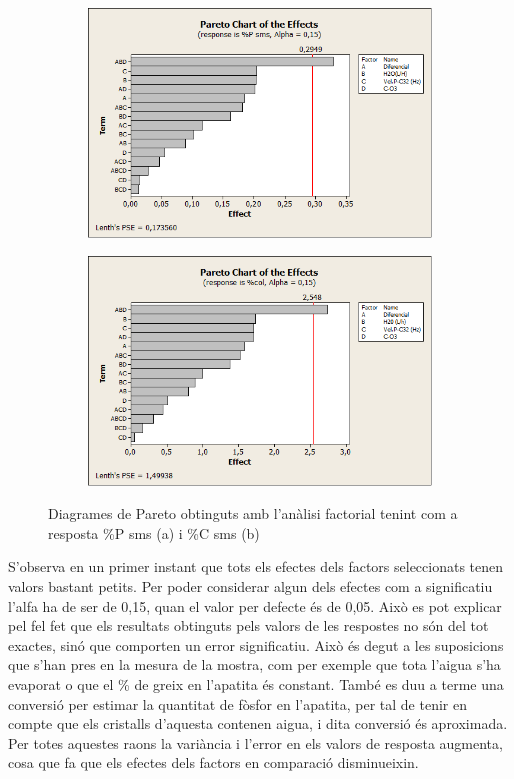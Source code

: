\documentclass[a4paper]{article}
\begin{document}
\begin{figure}[H]
	\begin{subfigure}{.5\textwidth}
		\centering
		\includegraphics[width=.9\linewidth]{images/Pareto15P}
		\caption{}
		\label{fig:Pareto15P}
	\end{subfigure}%
	\begin{subfigure}{.5\textwidth}
		\centering
		\includegraphics[width=.9\linewidth]{images/Pareto15col}
		\caption{}
		\label{fig:Pareto15C}
	\end{subfigure}
	\caption{Diagrames de Pareto obtinguts amb l’anàlisi factorial tenint com a resposta \%P sms (a) i \%C sms (b)}
	\label{fig:Pareto15}
\end{figure}

S’observa en un primer instant que tots els efectes dels factors seleccionats tenen valors bastant petits. Per poder considerar algun dels efectes com a significatiu l’alfa ha de ser de 0,15, quan el valor per defecte és de 0,05. Això es pot explicar pel fel fet que els resultats obtinguts pels valors de les respostes no són del tot exactes, sinó que comporten un error significatiu. Això és degut a les suposicions que s’han pres en la mesura de la mostra, com per exemple que tota l’aigua s’ha evaporat o que el \% de greix en l’apatita és constant. També es duu a terme una conversió per estimar la quantitat de fòsfor en l’apatita, per tal de tenir en compte que els cristalls d’aquesta contenen aigua, i dita conversió és aproximada. Per totes aquestes raons la variància i l’error en els valors de resposta augmenta, cosa que fa que els efectes dels factors en comparació disminueixin.
\end{document}
